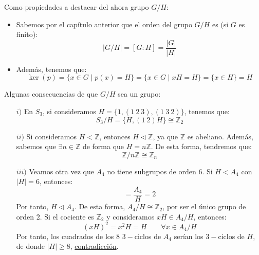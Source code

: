 Como propiedades a destacar del ahora grupo $G/H$:

\begin{itemize}
    \item Sabemos por el capítulo anterior que el orden del grupo $G/H$ es (si $G$ es finito):
        \begin{equation*}
            |G/H| = [G:H] = \dfrac{|G|}{|H|}
        \end{equation*}
    \item Además, tenemos que: 
        \begin{equation*}
            \ker(p) = \{x\in G\mid p(x) = H\} = \{x\in G\mid xH = H\} = \{x\in H\} = H
        \end{equation*}
\end{itemize}

\begin{ejemplo}
    Algunas consecuencias de que $G/H$ sea un grupo:
    \begin{enumerate}
        \item[$i)$] En $S_3$, si consideramos $H = \{1, (1\ 2\ 3), (1\ 3\ 2)\}$, tenemos que:
            \begin{equation*}
                S_3/H = \{H, (1\ 2)H\} \cong \mathbb{Z}_2
            \end{equation*}
        \item[$ii)$] Si consideramos $H<\mathbb{Z}$, entonces $H\lhd \mathbb{Z}$, ya que $\mathbb{Z}$ es abeliano. Además, sabemos que $\exists n\in \mathbb{Z}$ de forma que $H = n\mathbb{Z}$. De esta forma, tendremos que:
            \begin{equation*}
                \mathbb{Z}/n\mathbb{Z} \cong \mathbb{Z}_n
            \end{equation*}
        \item[$iii)$] Veamos otra vez que $A_4$ no tiene subgrupos de orden 6. Si $H<A_4$ con $|H| = 6$, entonces:
            \begin{equation*}
                [A_4:H] = \dfrac{A_4}{H} = 2
            \end{equation*}
            Por tanto, $H\lhd A_4$. De esta forma, $A_4/H\cong \mathbb{Z}_2$, por ser el único grupo de orden 2. Si el cociente es $\mathbb{Z}_2$ y consideramos $xH\in A_4/H$, entonces:
            \begin{equation*}
                {(xH)}^{2} = x^2H = H \qquad \forall x\in A_4/H
            \end{equation*}
            Por tanto, los cuadrados de los 8 $3-$ciclos de $A_4$ serían los $3-$ciclos de $H$, de donde $|H| \geq 8$, \underline{contradicción}.
    \end{enumerate}
\end{ejemplo}

